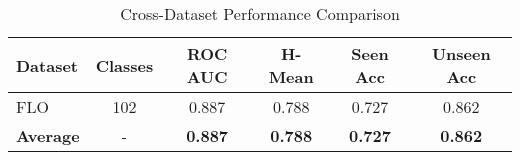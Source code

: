 
\begin{table}[htbp]
\centering
\caption{Cross-Dataset Performance Comparison}
\label{tab:cross_dataset}
\begin{tabular}{|l|c|c|c|c|c|}
\hline
\textbf{Dataset} & \textbf{Classes} & \textbf{ROC AUC} & \textbf{H-Mean} & \textbf{Seen Acc} & \textbf{Unseen Acc} \\
\hline
FLO & 102 & 0.887 & 0.788 & 0.727 & 0.862 \\
\hline
\textbf{Average} & - & \textbf{0.887} & \textbf{0.788} & \textbf{0.727} & \textbf{0.862} \\
\hline
\end{tabular}
\end{table}
